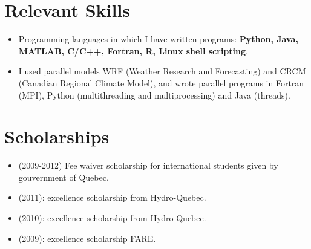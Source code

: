 \documentclass[12pt,a4paper,sans]{moderncv}
\begin{document}
\section*{Relevant Skills}
\begin{itemize}
  \item Programming languages in which I have written programs: \textbf{ Python,
  Java, MATLAB, C/C++, Fortran, R, Linux shell scripting}.
  \item I used parallel models WRF (Weather Research and Forecasting) and CRCM
  (Canadian Regional Climate Model), and wrote parallel programs in Fortran
  (MPI), Python (multithreading and multiprocessing) and Java (threads).
\end{itemize}


\section*{Scholarships}

\begin{itemize}
    \item (2009-2012) Fee waiver scholarship for international students given
    by gouvernment of Quebec.
    \item (2011): excellence scholarship from Hydro-Quebec.
    \item (2010): excellence scholarship from Hydro-Quebec.
    \item (2009): excellence scholarship FARE.
\end{itemize}


\end{document}
